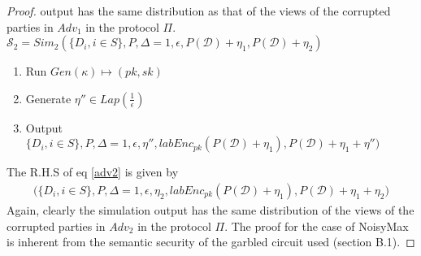 \begin{proof}
output has the same distribution as that of the views of the corrupted parties in $Adv_1$ in the
protocol $\Pi$.\\
$\mathcal{S}_2=Sim_2(\{D_i, i \in S\},P,\Delta=1,\epsilon,P(\mathcal{D})+\eta_1,P(\mathcal{D})+\eta_2)$
\begin{enumerate}\item Run $Gen(\kappa)\mapsto (pk,sk)$ \item Generate $\eta'' \in Lap(\frac{1}{\epsilon})$ \item Output $\Big\{D_i, i \in S\},P,\Delta=1,\epsilon, \eta'', labEnc_{pk}(P(\mathcal{D})+\eta_1), P(\mathcal{D})+\eta_1+\eta''\Big)$
\end{enumerate}
The R.H.S of eq \ref{adv2} is given by \begin{gather}\Big(\{D_i, i \in S\},P,\Delta=1,\epsilon,\eta_2,labEnc_{pk}(P(\mathcal{D})+\eta_1),P(\mathcal{D})+\eta_1+\eta_2\Big)\end{gather}
Again, clearly the simulation output has the same distribution of the
views of the corrupted parties in $Adv_2$ in the protocol $\Pi$. 
The proof for the case of NoisyMax is inherent from the semantic security of the garbled circuit used (section B.1).
\end{proof}